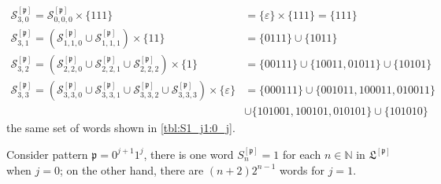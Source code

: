 \begin{displaymath}
\begin{split}
    \mathcal{S}_{3, 0}^{[\mathfrak{p}]}=\mathcal{S}_{0, 0, 0}^{[\mathfrak{p}]}\times\lbrace 111 \rbrace &= \lbrace \varepsilon \rbrace\times\lbrace 111 \rbrace= \{111\}\\
    \mathcal{S}_{3, 1}^{[\mathfrak{p}]}={\left(\mathcal{S}_{1, 1, 0}^{[\mathfrak{p}]}\cup\mathcal{S}_{1, 1, 1}^{[\mathfrak{p}]}\right)\times \lbrace 11 \rbrace} &= \{0111\}\cup\{1011\}\\
    \mathcal{S}_{3, 2}^{[\mathfrak{p}]}={\left(\mathcal{S}_{2, 2, 0}^{[\mathfrak{p}]}\cup\mathcal{S}_{2, 2, 1}^{[\mathfrak{p}]}\cup\mathcal{S}_{2, 2, 2}^{[\mathfrak{p}]}\right)\times \lbrace 1 \rbrace} &=\{00111\}\cup\{10011, 01011\}\cup\{10101\}\\
    \mathcal{S}_{3, 3}^{[\mathfrak{p}]}={\left(\mathcal{S}_{3, 3, 0}^{[\mathfrak{p}]}\cup\mathcal{S}_{3, 3, 1}^{[\mathfrak{p}]}\cup\mathcal{S}_{3, 3, 2}^{[\mathfrak{p}]}\cup\mathcal{S}_{3, 3, 3}^{[\mathfrak{p}]}\right)\times \lbrace \varepsilon \rbrace} &= \{000111\}\cup\{001011, 100011, 010011\} \\
            &\cup\{101001, 100101, 010101\}\cup\{101010\}
\end{split}
\end{displaymath}
the same set of words shown in \autoref{tbl:S1_j1:0_j}.

\begin{coro}
\label{coro:0_j1_1_j}
Consider pattern $\mathfrak{p}=0^{j+1}1^{j}$, there is one word
$S_{n}^{[\mathfrak{p}]} = 1$ for each $n\in\mathbb{N}$ in
$\mathfrak{L}^{[\mathfrak{p}]}$ when $j=0$; on the other hand, there are
$(n+2)2^{n-1}$ words for $j=1$.
\end{coro}

